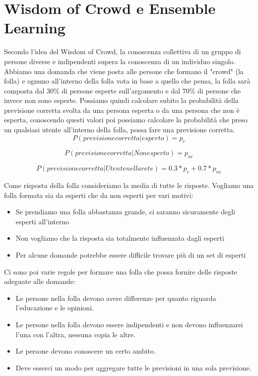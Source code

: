 \documentclass[14pt]{extreport}
\begin{document}
\chapter{Wisdom of Crowd e Ensemble Learning}

Secondo l'idea del Wisdom of Crowd, la conoscenza collettiva di un gruppo di persone diverse e indipendenti supera la conoscenza di un individuo singolo. 
Abbiamo una domanda che viene posta alle persone che formano il "crowd" (la folla) e ognuno all'interno della folla vota in base a quello che pensa, la folla sarà composta dal 30\% di persone esperte sull'argomento e dal 70\% di persone che invece non sono esperte.
Possiamo quindi calcolare subito la probabilità della previsione corretta svolta da una persona esperta o da una persona che non è esperta, conoscendo questi valori poi possiamo calcolare la probabilità che preso un qualsiasi utente all'interno della folla, possa fare una previsione corretta.
\begin{equation}
    P(previsione corretta | esperto) = p_e
\end{equation}

\begin{equation}
    P(previsione corretta | Non esperto) = p_{ne}
\end{equation}

\begin{equation}
    P(previsione corretta | Utente nella rete) = 0.3*p_e + 0.7*p_{ne}
\end{equation}

Come risposta della folla consideriamo la media di tutte le risposte. Vogliamo una folla formata sia da esperti che da non esperti per vari motivi:
\begin{itemize}
    \item Se prendiamo una folla abbastanza grande, ci saranno sicuramente degli esperti all'interno
    \item Non vogliamo che la risposta sia totalmente influenzata dagli esperti
    \item Per alcune domande potrebbe essere difficile trovare più di un set di esperti
\end{itemize}

Ci sono poi varie regole per formare una folla che possa fornire delle risposte adeguate alle domande:
\begin{itemize}
    \item Le persone nella folla devono avere differenze per quanto riguarda l'educazione e le opinioni.
    \item Le persone nella folla devono essere indipendenti e non devono influenzarsi l'una con l'altra, nessuna copia le altre.
    \item Le persone devono conoscere un certo ambito.
    \item Deve esserci un modo per aggregare tutte le previsioni in una sola previsione.
\end{itemize}
\end{document}
